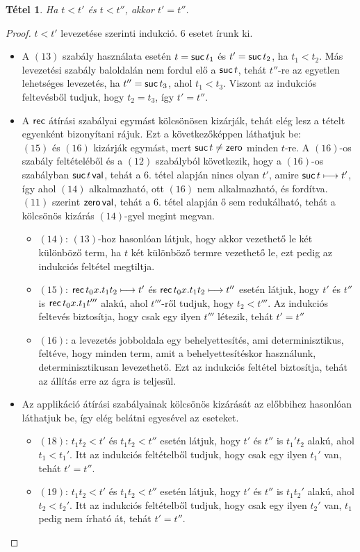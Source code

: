 \documentclass[a4paper]{article}
\numberwithin{equation}{section}
\theoremstyle{magyar}
\newtheorem{thm}{Tétel}[section]
\begin{document}
\begin{thm}\label{lem:natbool-opsem-determ}
	Ha $t \lt t'$ és $t \lt t''$, akkor $t' = t''$.
\end{thm}
\begin{proof}
	$t \lt t'$ levezetése szerinti indukció. 6 esetet írunk ki.
	\begin{itemize}
		\item A $(13)$ szabály használata esetén $t = \mathsf{suc}\,t_1$ és
		      $t' = \mathsf{suc}\,t_2$, ha $t_1 \lt t_2$. Más levezetési szabály baloldalán nem fordul elő a $\mathsf{suc}\,t$, tehát $t''$-re az egyetlen lehetséges levezetés, ha $t''=\mathsf{suc}\,t_3$, ahol $t_1 \lt t_3$. Viszont az indukciós feltevésből tudjuk, hogy $t_2 = t_3$, így $t'=t''$.
    	\item A $\mathsf{rec}$ átírási szabályai egymást kölcsönösen kizárják, tehát elég lesz a tételt egyenként bizonyítani rájuk. Ezt a következőképpen láthatjuk be: \\
    	$(15)$ és $(16)$ kizárják egymást, mert $\mathsf{suc}\,t \neq \mathsf{zero}$ minden $t$-re. A $(16)$-os szabály feltételéből és a $(12)$ szabályból következik, hogy a $(16)$-os szabályban $\mathsf{suc}\,t \,\mathsf{val}$, tehát a 6. tétel alapján nincs olyan $t'$, amire $\mathsf{suc}\,t \longmapsto t'$, így ahol $(14)$ alkalmazható, ott $(16)$ nem alkalmazható, és fordítva. $(11)$ szerint $\mathsf{zero} \,\mathsf{val}$, tehát a 6. tétel alapján ő sem redukálható, tehát a kölcsönös kizárás $(14)$-gyel megint megvan.
    	\begin{itemize}
    		\item $(14)$: $(13)$-hoz hasonlóan látjuk, hogy akkor vezethető le két különböző term, ha $t$ két különböző termre vezethető le, ezt pedig az indukciós feltétel megtiltja.
    		\item $(15)$: $\mathsf{rec}\,t_0 x.t_1 t_2 \longmapsto t' $ és $\mathsf{rec}\,t_0 x.t_1 t_2 \longmapsto t'' $ esetén látjuk, hogy $t'$ és $t''$ is $\mathsf{rec}\,t_0 x.t_1 t'''$ alakú, ahol $t'''$-ről tudjuk, hogy $t_2 \lt t'''$. Az indukciós feltevés biztosítja, hogy csak egy ilyen $t'''$ létezik, tehát $t' = t''$
    		\item $(16)$: a levezetés jobboldala egy behelyettesítés, ami determinisztikus, feltéve, hogy minden term, amit a behelyettesítéskor használunk, determinisztikusan levezethető. Ezt az indukciós feltétel biztosítja, tehát az állítás erre az ágra is teljesül.
    	\end{itemize}
    	\item Az applikáció átírási szabályainak kölcsönös kizárását az előbbihez hasonlóan láthatjuk be, így elég belátni egyesével az eseteket.
    	\begin{itemize}
    		\item $(18)$: $t_1 t_2 \lt t'$ és $t_1 t_2 \lt t''$ esetén látjuk, hogy $t'$ és $t''$ is $t_1' t_2$ alakú, ahol $t_1 \lt t_1'$. Itt az indukciós feltételből tudjuk, hogy csak egy ilyen $t_1'$ van, tehát $t' = t''$.
    		\item $(19)$: $t_1 t_2 \lt t'$ és $t_1 t_2 \lt t''$ esetén látjuk, hogy $t'$ és $t''$ is $t_1 t_2'$ alakú, ahol $t_2 \lt t_2'$. Itt az indukciós feltételből tudjuk, hogy csak egy ilyen $t_2'$ van, $t_1$ pedig nem írható át, tehát $t' = t''$.
    	\end{itemize}
    \end{itemize}
\end{proof}
\end{document}
